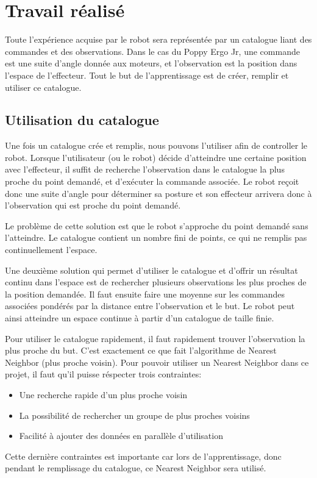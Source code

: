 \documentclass[11pt,french]{report}
\begin{document}
\chapter{Travail réalisé}

Toute l'expérience acquise par le robot sera représentée par un catalogue liant des commandes et des observations.
Dans le cas du Poppy Ergo Jr, une commande est une suite d'angle donnée aux moteurs, et l'observation est la position dans l'espace de l'effecteur.
Tout le but de l'apprentissage est de créer, remplir et utiliser ce catalogue.

\section{Utilisation du catalogue}

Une fois un catalogue crée et remplis, nous pouvons l'utiliser afin de controller le robot.
Lorsque l'utilisateur (ou le robot) décide d'atteindre une certaine position avec l'effecteur, il suffit de recherche l'observation dans le catalogue la plus proche du point demandé, et d'exécuter la commande associée.
Le robot reçoit donc une suite d'angle pour déterminer sa posture et son effecteur arrivera donc à l'observation qui est proche du point demandé.

Le problème de cette solution est que le robot s'approche du point demandé sans l'atteindre.
Le catalogue contient un nombre fini de points, ce qui ne remplis pas continuellement l'espace.

Une deuxième solution qui permet d'utiliser le catalogue et d'offrir un résultat continu dans l'espace est de rechercher plusieurs observations les plus proches de la position demandée.
Il faut ensuite faire une moyenne sur les commandes associées pondérés par la distance entre l'observation et le but.
Le robot peut ainsi atteindre un espace continue à partir d'un catalogue de taille finie.

\phantom{INVISIBLE LINE}

Pour utiliser le catalogue rapidement, il faut rapidement trouver l'observation la plus proche du but.
C'est exactement ce que fait l'algorithme de Nearest Neighbor (plus proche voisin).
Pour pouvoir utiliser un Nearest Neighbor dans ce projet, il faut qu'il puisse réspecter trois contraintes:
\begin{itemize}
    \item Une recherche rapide d'un plus proche voisin
    \item La possibilité de rechercher un groupe de plus proches voisins
    \item Facilité à ajouter des données en parallèle d'utilisation
\end{itemize}
Cette dernière contraintes est importante car lors de l'apprentissage, donc pendant le remplissage du catalogue, ce Nearest Neighbor sera utilisé.
\end{document}
